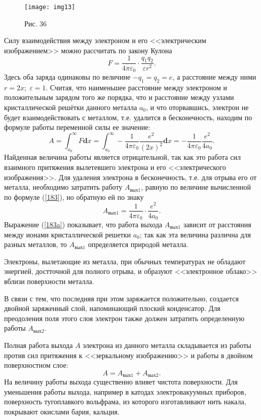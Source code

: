 \documentclass[a4paper,10pt]{book}
\begin{document}
\begin{figure}[h]
\texttt{[image: img13]}
\caption{Рис. 36}
\label{img13}
\end{figure}
Силу взаимодействия между электроном и его <<электрическим изображением>> можно рассчитать по закону Кулона
\begin{equation*}
 F = \frac{1}{4\pi\varepsilon_0}\cdot\frac{q_1q_2}{\varepsilon r^2}.
\end{equation*}
Здесь оба заряда одинаковы по величине $-q_1 = q_2 = e$, а расстояние между ними $r = 2x;\;\varepsilon=1$. Считая, что наименьшее расстояние между электроном и положительным зарядом того же порядка, что и расстояние между узлами кристаллической решётки данного металла $a_0$, и что оторвавшись, электрон не будет взаимодействовать с металлом, т.е. удалится в бесконечность, находим по формуле работы переменной силы ее значение:
\begin{equation}\label{183}
 A = \int_{a_0}^\infty F\mathbf{d}x = \int_{a_0}^\infty - \frac{1}{4\pi\varepsilon_0}\frac{e^2}{(2x)^2}\mathbf{d}x = -\frac{1}{4\pi\varepsilon_0}\frac{e^2}{4a_0}.
\end{equation}
Найденная величина работы является отрицательной, так как это работа сил взаимного притяжения вылетевшего электрона и его <<электрического изображения>>. Для удаления электрона в бесконечность, т.е. для отрыва его от металла, необходимо затратить работу $A_\text{вых1}$, равную по величине вычисленной по формуле (\ref{183}), но обратную ей по знаку
\begin{equation}\label{183a}
 A_\text{вых1} = \frac{1}{4\pi\varepsilon_0}\cdot\frac{e^2}{4a_0}.
\end{equation}
Выражение (\ref{183a}) показывает, что работа выхода $A_\text{вых1}$ зависит от расстояния между ионами кристаллической решетки $a_0$; так как эта величина различна для разных металлов, то $A_\text{вых1}$ определяется природой металла.

Электроны, вылетающие из металла, при обычных температурах не обладают энергией, достточной для полного отрыва, и образуют <<электронное облако>> вблизи поверхности металла.

В связи с тем, что последняя при этом заряжается положительно, создается двойной заряженный слой, напоминающий плоский конденсатор. Для преодоления поля этого слоя электрон также должен затратить определенную работы $A_\text{вых2}$.

Полная работа выхода $A$ электрона из данного металла складывается из работы против сил притяжения к <<зеркальному изображению>> и работы в двойном поверхностном слое:
\begin{equation*}
 A = A_\text{вых1} + A_\text{вых2}.
\end{equation*}
На величину работы выхода существенно влияет чистота поверхности. Для уменьшения работы выхода, например в катодах электровакуумных приборов, поверхность тугоплавкого вольфрама, из которого изготавливают нить накала, покрывают окислами бария, кальция.
\end{document}
